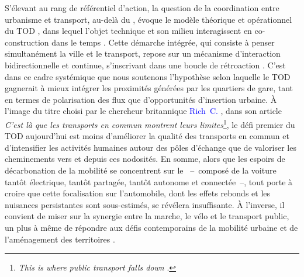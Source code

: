 \begin{refsegment}
S’élevant au rang de référentiel d’action, la question de la coordination entre urbanisme et transport, au-delà du , évoque le modèle théorique et opérationnel du \acrfull{TOD} \textcolor{blue}{\autocite[183-220]{gallez_mythes_2010}}, dans lequel l’objet technique et son milieu interagissent en co-construction dans le temps \textcolor{blue}{\autocite[44-50]{leheis-guillot_ville_2011}}. Cette démarche intégrée, qui consiste à penser simultanément la ville et le transport, repose sur un mécanisme d’interaction bidirectionnelle et continue, s’inscrivant dans une boucle de rétroaction \textcolor{blue}{\autocite[130]{wegener_overview_2004}}. C’est dans ce cadre systémique que nous soutenons l’hypothèse selon laquelle le \acrshort{TOD} gagnerait à mieux intégrer les proximités générées par les quartiers de gare, tant en termes de polarisation des flux que d’opportunités d’insertion urbaine. À l’image du titre choisi par le chercheur britannique \textcolor{blue}{Rich~C.} \textcolor{blue}{\textcite[40]{mcilroy_this_2023}}, dans son article \textsl{C'est là que les transports en commun montrent leurs limites}\footnote{
    \textsl{This is where public transport falls down} \textcolor{blue}{\autocite[40]{mcilroy_this_2023}}.
}, le défi premier du \acrshort{TOD} aujourd’hui est moins d'améliorer la qualité des transports en commun et d'intensifier les activités humaines autour des pôles d'échange que de valoriser les cheminements vers et depuis ces nodosités. En somme, alors que les espoirs de décarbonation de la mobilité se concentrent sur le ~–~composé de la voiture tantôt électrique, tantôt partagée, tantôt autonome et connectée~–, tout porte à croire que cette focalisation sur l’automobile, dont les effets rebonds et les nuisances persistantes sont sous-estimés, se révélera insuffisante. À l’inverse, il convient de miser sur la synergie entre la marche, le \gls{vélo} et le transport public, un  plus à même de répondre aux défis contemporains de la mobilité urbaine et de l’aménagement des territoires \textcolor{blue}{\autocite[1]{soulas_triptyque_2021}}.%


\end{refsegment}
